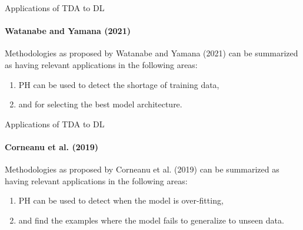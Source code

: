 \documentclass[pdf]{beamer}
\begin{document}
    \begin{frame}{Applications of TDA to DL}
        \framesubtitle{Watanabe and Yamana (2021)}

        Methodologies as proposed by Watanabe and Yamana (2021) can be summarized as having relevant 
        applications in the following areas:

        \begin{enumerate}
            \item PH can be used to detect the shortage of training data,
            \item and for selecting the best model architecture.
        \end{enumerate}
    \end{frame}

    \begin{frame}{Applications of TDA to DL}
        \framesubtitle{Corneanu et al. (2019)}

        Methodologies as proposed by Corneanu et al. (2019) can be summarized as having relevant
        applications in the following areas:

        \begin{enumerate}
            \item PH can be used to detect when the model is over-fitting,
            \item and find the examples where the model fails to generalize to unseen data.
        \end{enumerate}
    \end{frame}
\end{document}
